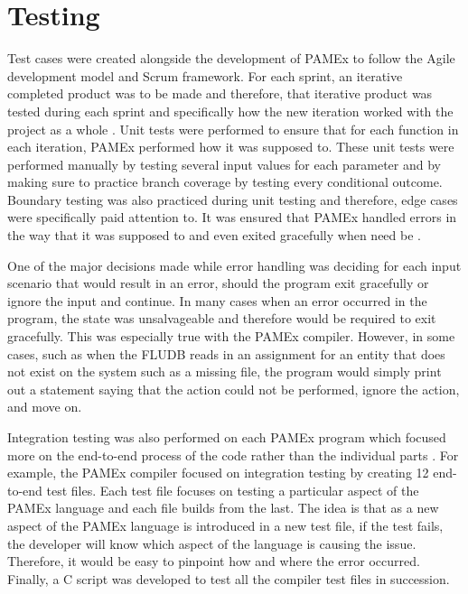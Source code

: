 \section{Testing}
\label{sec:Testing}

\par 
\vspace{\baselineskip}
\hspace{1em}
Test cases were created alongside the development of PAMEx to follow 
the Agile development model and Scrum framework. For each sprint, an 
iterative completed product was to be made and therefore, that 
iterative product was tested during each sprint and specifically how 
the new iteration worked with the project as a whole \cite{lacey2015}. Unit tests were 
performed to ensure that for each function in each 
iteration, PAMEx performed how it was supposed to. These unit tests were performed manually by testing several input values for each 
parameter and by making sure to practice branch coverage by testing every 
conditional outcome. Boundary testing was also practiced during unit 
testing and therefore, edge cases were specifically paid attention to. It was 
ensured that PAMEx handled errors in the way that it was supposed to 
and even exited gracefully when need be \cite{jorgensen2021}.  

One of the major decisions made while error handling was deciding for 
each input scenario that would result in an error, should the program 
exit gracefully or ignore the input and continue. In many cases when an 
error occurred in the program, the state was unsalvageable and 
therefore would be required to exit gracefully. This was especially 
true with the PAMEx compiler. However, in some cases, such as when the 
FLUDB reads in an assignment for an entity that does not exist on the 
system such as a missing file, the program would simply print out a 
statement saying that the action could not be performed, ignore the 
action, and move on. 

Integration testing was also performed on each PAMEx program which 
focused more on the end-to-end process of the code rather than the 
individual parts \cite{jorgensen2021}. For example, the PAMEx compiler focused on 
integration testing by creating 12 end-to-end test files. Each test 
file focuses on testing a particular aspect of the PAMEx language and 
each file builds from the last. The idea is that as a new aspect of 
the PAMEx language is introduced in a new test file, if the test fails, 
the developer will know which aspect of the language is causing the 
issue. Therefore, it would be easy to pinpoint how and where 
the error occurred. Finally, a C script was developed to test 
all the compiler test files in succession.  

